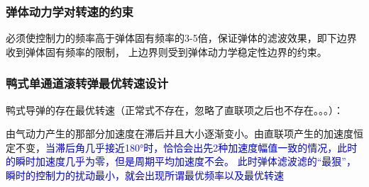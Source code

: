\subsubsection{弹体动力学对转速的约束}
必须使控制力的频率高于弹体固有频率的3-5倍，保证弹体的滤波效果，即下边界收到弹体固有频率的限制，
上边界则受到弹体动力学稳定性边界的约束。
\subsubsection{鸭式单通道滚转弹最优转速设计}
鸭式导弹的存在最优转速（正常式不存在，忽略了直联项之后也不存在。。。）：

由气动力产生的那部分加速度在滞后并且大小逐渐变小。由直联项产生的加速度恒定不变，{\kaishu \textcolor{blue}
{当滞后角几乎接近180°时，恰恰会出先2种加速度幅值一致的情况，此时的瞬时加速度几乎为零，但是周期平均加速度不会。
此时弹体滤波滤的“最狠”，瞬时的控制力的扰动最小，就会出现所谓最优频率以及最优转速}}